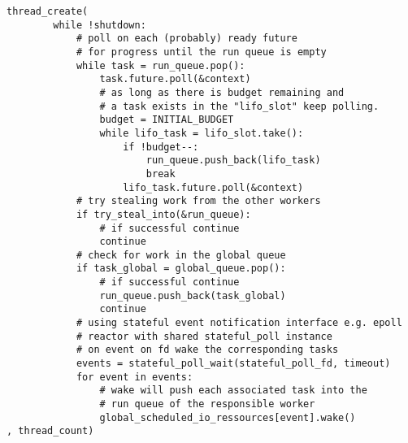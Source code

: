 \begin{lstlisting}
thread_create(
        while !shutdown:
            # poll on each (probably) ready future
            # for progress until the run queue is empty
            while task = run_queue.pop():
                task.future.poll(&context)
                # as long as there is budget remaining and
                # a task exists in the "lifo_slot" keep polling.
                budget = INITIAL_BUDGET
                while lifo_task = lifo_slot.take():
                    if !budget--:
                        run_queue.push_back(lifo_task)
                        break
                    lifo_task.future.poll(&context)
            # try stealing work from the other workers
            if try_steal_into(&run_queue):
                # if successful continue
                continue
            # check for work in the global queue
            if task_global = global_queue.pop():
                # if successful continue
                run_queue.push_back(task_global)
                continue
            # using stateful event notification interface e.g. epoll
            # reactor with shared stateful_poll instance
            # on event on fd wake the corresponding tasks
            events = stateful_poll_wait(stateful_poll_fd, timeout)
            for event in events:
                # wake will push each associated task into the
                # run queue of the responsible worker
                global_scheduled_io_ressources[event].wake()
, thread_count)
\end{lstlisting}